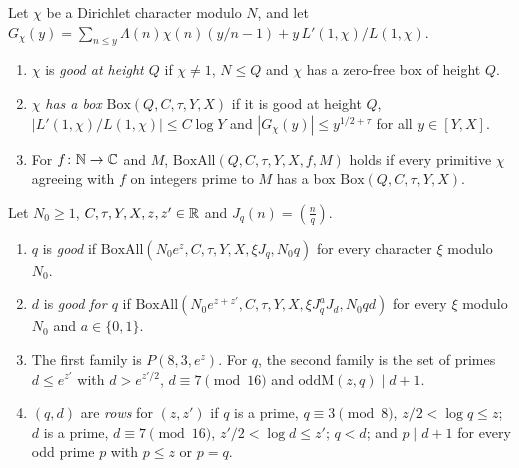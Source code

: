 \begin{definition}[boxes]\label{host:box}
Let $\chi$ be a Dirichlet character modulo $N$, and let
$G_{\chi}(y)=\sum_{n\le y}\Lambda(n)\chi(n)(y/n-1)+y\,L'(1,\chi)/L(1,\chi)$.
\begin{enumerate}
\item $\chi$ is \emph{good at height $Q$} if $\chi\ne1$, $N\le Q$ and
  $\chi$ has a zero-free box of height $Q$.
\item $\chi$ \emph{has a box} $\mathrm{Box}(Q,C,\tau,Y,X)$ if it is good at
  height $Q$, $|L'(1,\chi)/L(1,\chi)|\le C\log Y$ and
  $|G_{\chi}(y)|\le y^{1/2+\tau}$ for all $y\in[Y,X]$.
\item For $f\colon\mathbb{N}\to\mathbb{C}$ and $M$, $\mathrm{BoxAll}(Q,C,\tau,Y,X,f,M)$
  holds if every primitive $\chi$ agreeing with $f$ on integers prime to
  $M$ has a box $\mathrm{Box}(Q,C,\tau,Y,X)$.
\end{enumerate}
\end{definition}

\begin{definition}\label{host:good-qd}
Let $N_0\ge1$, $C,\tau,Y,X,z,z'\in\mathbb{R}$ and $J_q(n)=\left(\frac nq\right)$.
\begin{enumerate}
\item $q$ is \emph{good} if $\mathrm{BoxAll}(N_0e^z,C,\tau,Y,X,\xi J_q,
  N_0q)$ for every character $\xi$ modulo $N_0$.
\item $d$ is \emph{good for $q$} if $\mathrm{BoxAll}(N_0e^{z+z'},C,\tau,Y,X,
  \xi J_q^aJ_d,N_0qd)$ for every $\xi$ modulo $N_0$ and $a\in\{0,1\}$.
\item The first family is $P(8,3,e^z)$. For $q$, the second family is the
  set of primes $d\le e^{z'}$ with $d>e^{z'/2}$, $d\equiv7\pmod{16}$ and
  $\mathrm{oddM}(z,q)\mid d+1$.
\item $(q,d)$ are \emph{rows} for $(z,z')$ if $q$ is a prime, $q\equiv3
  \pmod8$, $z/2<\log q\le z$; $d$ is a prime, $d\equiv7\pmod{16}$,
  $z'/2<\log d\le z'$; $q<d$; and $p\mid d+1$ for every odd prime $p$ with
  $p\le z$ or $p=q$.
\end{enumerate}
\end{definition}

